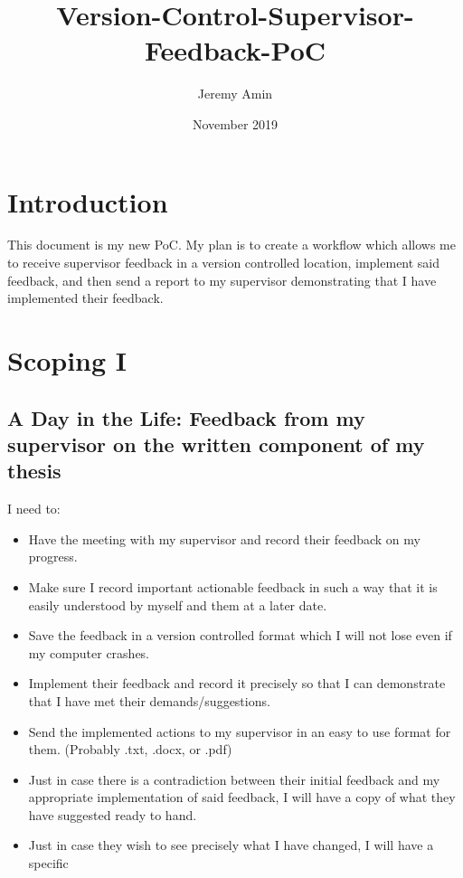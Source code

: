 \documentclass{article}
\title{Version-Control-Supervisor-Feedback-PoC}
\author{Jeremy Amin}
\date{November 2019}
\begin{document}
\maketitle
\tableofcontents

\pagebreak

\section{Introduction}

This document is my new PoC. My plan is to create a workflow which allows me to receive supervisor feedback in a version controlled location, implement said feedback, and then send a report to my supervisor demonstrating that I have implemented their feedback.

\section{Scoping I}

\subsection{A Day in the Life: Feedback from my supervisor on the written component of my thesis}

I need to:
\begin{itemize}
    \item Have the meeting with my supervisor and record their feedback on my progress.
    \item Make sure I record important actionable feedback in such a way that it is easily understood by myself and them at a later date.
    \item Save the feedback in a version controlled format which I will not lose even if my computer crashes.
    \item Implement their feedback and record it precisely so that I can demonstrate that I have met their demands/suggestions.
    \item Send the implemented actions to my supervisor in an easy to use format for them. (Probably .txt, .docx, or .pdf)
    \item Just in case there is a contradiction between their initial feedback and my appropriate implementation of said feedback, I will have a copy of what they have suggested ready to hand.
    \item Just in case they wish to see precisely what I have changed, I will have a specific 
\end{itemize}
\end{document}
